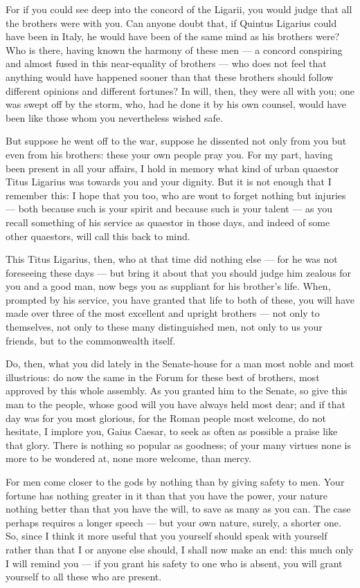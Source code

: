  For if you could see deep into the concord of the Ligarii, you would judge that all the brothers were with you. Can anyone doubt that, if Quintus Ligarius could have been in Italy, he would have been of the same mind as his brothers were? Who is there, having known the harmony of these men --- a concord conspiring and almost fused in this near-equality of brothers --- who does not feel that anything would have happened sooner than that these brothers should follow different opinions and different fortunes? In will, then, they were all with you; one was swept off by the storm, who, had he done it by his own counsel, would have been like those whom you nevertheless wished safe.

 But suppose he went off to the war, suppose he dissented not only from you but even from his brothers: these your own people pray you. For my part, having been present in all your affairs, I hold in memory what kind of urban quaestor Titus Ligarius was towards you and your dignity. But it is not enough that I remember this: I hope that you too, who are wont to forget nothing but injuries --- both because such is your spirit and because such is your talent --- as you recall something of his service as quaestor in those days, and indeed of some other quaestors, will call this back to mind.

 This Titus Ligarius, then, who at that time did nothing else --- for he was not foreseeing these days --- but bring it about that you should judge him zealous for you and a good man, now begs you as suppliant for his brother's life. When, prompted by his service, you have granted that life to both of these, you will have made over three of the most excellent and upright brothers --- not only to themselves, not only to these many distinguished men, not only to us your friends, but to the commonwealth itself.

 Do, then, what you did lately in the Senate-house for a man most noble and most illustrious: do now the same in the Forum for these best of brothers, most approved by this whole assembly. As you granted him to the Senate, so give this man to the people, whose good will you have always held most dear; and if that day was for you most glorious, for the Roman people most welcome, do not hesitate, I implore you, Gaius Caesar, to seek as often as possible a praise like that glory. There is nothing so popular as goodness; of your many virtues none is more to be wondered at, none more welcome, than mercy.

 For men come closer to the gods by nothing than by giving safety to men. Your fortune has nothing greater in it than that you have the power, your nature nothing better than that you have the will, to save as many as you can. The case perhaps requires a longer speech --- but your own nature, surely, a shorter one. So, since I think it more useful that you yourself should speak with yourself rather than that I or anyone else should, I shall now make an end: this much only I will remind you --- if you grant his safety to one who is absent, you will grant yourself to all these who are present.
